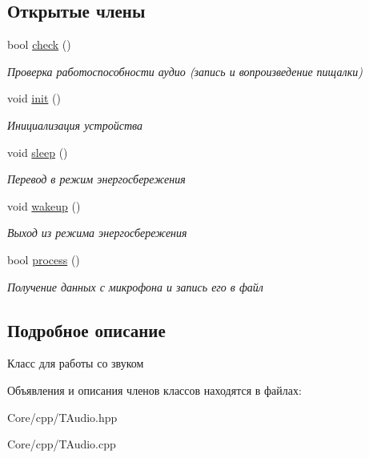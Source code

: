 \subsection*{Открытые члены}
\begin{DoxyCompactItemize}
\item 
\mbox{\label{classunit_1_1_t_audio_a69cc926edc98c59e9ffaad10ceb605f0}} 
bool \hyperlink{classunit_1_1_t_audio_a69cc926edc98c59e9ffaad10ceb605f0}{check} ()
\begin{DoxyCompactList}\small\item\em Проверка работоспособности аудио (запись и вопроизведение пищалки) \end{DoxyCompactList}\item 
\mbox{\label{classunit_1_1_t_audio_a362d211c87c2497e12792243cc2c0fc9}} 
void \hyperlink{classunit_1_1_t_audio_a362d211c87c2497e12792243cc2c0fc9}{init} ()
\begin{DoxyCompactList}\small\item\em Инициализация устройства \end{DoxyCompactList}\item 
\mbox{\label{classunit_1_1_t_audio_aab519e5239080d5ef906293dedc9399a}} 
void \hyperlink{classunit_1_1_t_audio_aab519e5239080d5ef906293dedc9399a}{sleep} ()
\begin{DoxyCompactList}\small\item\em Перевод в режим энергосбережения \end{DoxyCompactList}\item 
\mbox{\label{classunit_1_1_t_audio_a3cbc7de5ae0d03af42eeed896829d85c}} 
void \hyperlink{classunit_1_1_t_audio_a3cbc7de5ae0d03af42eeed896829d85c}{wakeup} ()
\begin{DoxyCompactList}\small\item\em Выход из режима энергосбережения \end{DoxyCompactList}\item 
\mbox{\label{classunit_1_1_t_audio_ad547ef4d28534b9cd76d2e7eb539d1e0}} 
bool \hyperlink{classunit_1_1_t_audio_ad547ef4d28534b9cd76d2e7eb539d1e0}{process} ()
\begin{DoxyCompactList}\small\item\em Получение данных с микрофона и запись его в файл \end{DoxyCompactList}\end{DoxyCompactItemize}


\subsection{Подробное описание}


 Класс для работы со звуком 

Объявления и описания членов классов находятся в файлах\+:\begin{DoxyCompactItemize}
\item 
Core/cpp/T\+Audio.\+hpp\item 
Core/cpp/T\+Audio.\+cpp\end{DoxyCompactItemize}
